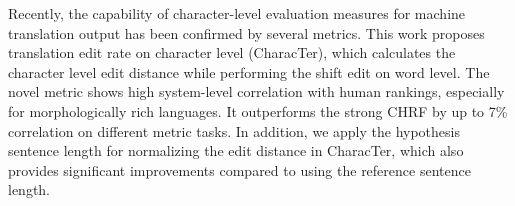 Recently, the capability of character-level evaluation measures for machine translation output has been confirmed by several metrics. This work proposes translation edit rate on character level (CharacTer), which calculates the character level edit distance while performing the shift edit on word level. The novel metric shows high system-level correlation with human rankings, especially for morphologically rich languages. It outperforms the strong CHRF by up to 7\% correlation on different metric tasks. In addition, we apply the hypothesis sentence length for normalizing the edit distance in CharacTer, which also provides significant improvements compared to using the reference sentence length.
